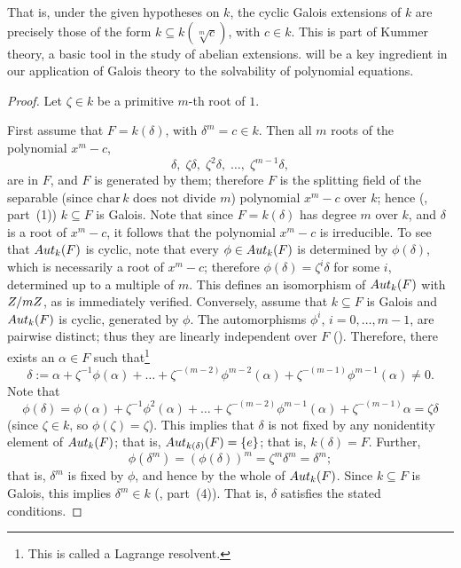 That is, under the given hypotheses on $k$, the cyclic Galois
extensions of $k$ are precisely those of the form
$k \subseteq k(\sqrt[m]{c})$, with $c \in k$. This is part of Kummer
theory, a basic tool in the study of abelian
extensions.  will be a key ingredient in our
application of Galois theory to the solvability of polynomial
equations.
\begin{proof}
  Let $\zeta \in k$ be a primitive $m$-th root of $1$.

  First assume that $F = k(\delta)$, with $\delta^m = c \in k$. Then
  all $m$ roots of the polynomial $x^m - c$,
  \[
    \delta,\; \zeta\delta,\; \zeta^2\delta,\; \dots,\;
    \zeta^{m-1}\delta,
  \]
  are in $F$, and $F$ is generated by them; therefore $F$ is the
  splitting field of the separable (since $\mathrm{char}\,k$ does not
  divide $m$) polynomial $x^m - c$ over $k$; hence
  (, part~(1)) $k \subseteq F$ is Galois. Note
  that since $F = k(\delta)$ has degree $m$ over $k$, and $\delta$ is
  a root of $x^m - c$, it follows that the polynomial $x^m - c$ is
  irreducible. To see
  that $Aut_k(F)$ is cyclic, note that every $\phi \in Aut_k(F)$ is
  determined by $\phi(\delta)$, which is necessarily a root of
  $x^m - c$; therefore $\phi(\delta) = \zeta^i \delta$ for some $i$,
  determined up to a multiple of $m$. This defines an isomorphism of
  $Aut_k(F)$ with $Z/mZ$, as is immediately verified.  Conversely,
  assume that $k \subseteq F$ is Galois and $Aut_k(F)$ is cyclic,
  generated by $\phi$. The automorphisms $\phi^i$,
  $i = 0, \dots, m-1$, are pairwise distinct; thus they are linearly
  independent over $F$
  (). Therefore,
  there exists an $\alpha \in F$ such that\footnote{This is called a
    Lagrange resolvent.}
  \[
    \delta := \alpha + \zeta^{-1}\phi(\alpha) + \dots +
    \zeta^{-(m-2)}\phi^{m-2}(\alpha) +
    \zeta^{-(m-1)}\phi^{m-1}(\alpha) \neq 0.
  \]
  Note that
  \[
    \phi(\delta) = \phi(\alpha) + \zeta^{-1}\phi^2(\alpha) + \dots +
    \zeta^{-(m-2)}\phi^{m-1}(\alpha) + \zeta^{-(m-1)}\alpha =
    \zeta\delta
  \]
  (since $\zeta \in k$, so $\phi(\zeta) = \zeta$). This implies that
  $\delta$ is not fixed by any nonidentity element of $Aut_k(F)$;
  that is, $Aut_{k(\delta)}(F) = \{e\}$; that is, $k(\delta) =
  F$. Further,
  \[
    \phi(\delta^m) = (\phi(\delta))^m = \zeta^m \delta^m = \delta^m;
  \]
  that is, $\delta^m$ is fixed by $\phi$, and hence by the whole of
  $Aut_k(F)$. Since $k \subseteq F$ is Galois, this implies
  $\delta^m \in k$ (, part~(4)). That is,
  $\delta$ satisfies the stated conditions.
\end{proof}

